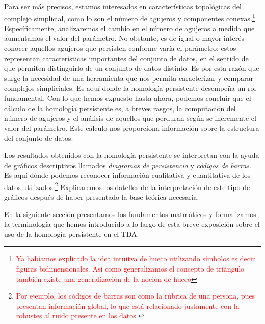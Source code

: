 \documentclass[a4paper,11pt]{article}
\newcommand{\red}[1]{\textcolor{red}{#1}}
\begin{document}
Para ser más precisos, estamos interesados en características topológicas del complejo simplicial, como lo son  el número de agujeros y componentes conexas.\footnote{\red{Ya  habíamos explicado la idea intuitva de hueco utilizando símbolos es decir figuras bidimensionales. Así como generalizamos el concepto de triángulo también existe una generalización de la noción de hueco}}
Específicamente,
analizaremos  el cambio en el  número de agujeros a medida que aumentamos el valor del parámetro.
No obstante, es de igual o mayor interés conocer aquellos agujeros que persisten conforme varía el parámetro; estos representan características importantes del conjunto de datos, en el sentido de que permiten distinguirlo de un conjunto de datos distinto. Es por esta razón que surge la necesidad de una herramienta que nos permita caracterizar y comparar complejos  simpliciales.
Es aquí donde  la homología persistente desempeña un rol fundamental.
Con lo que hemos expuesto hasta ahora, podemos concluir que  el cálculo de la homología persistente es, a breves rasgos, la computación del número de agujeros y el análisis de aquellos que perduran según se incremente  el valor del parámetro. Este cálculo nos proporciona información sobre la estructura del conjunto de datos.


Los resultados obtenidos con la homología persistente se  interpretan con la ayuda de gráficos descriptivos llamados \textit{diagramas de persistencia} y \textit{códigos de barras}.
Es aquí dónde podemos reconocer información cualitativa y cuantitativa de los datos utilizados.\footnote{\red{Por ejemplo, los códigos de barras son como la rúbrica de una persona, pues presentan información global, lo que está relacionado justamente con la robustes al ruido presente en los datos.}}
Explicaremos los datelles de la interpretación de este tipo de gráficos  después de haber presentado la base teórica necesaria.


En la siguiente sección presentamos los fundamentos matmáticos y formalizamos la terminología que hemos introducido a lo largo de esta breve exposición sobre el uso de  la homología persistente en el TDA.
\end{document}
